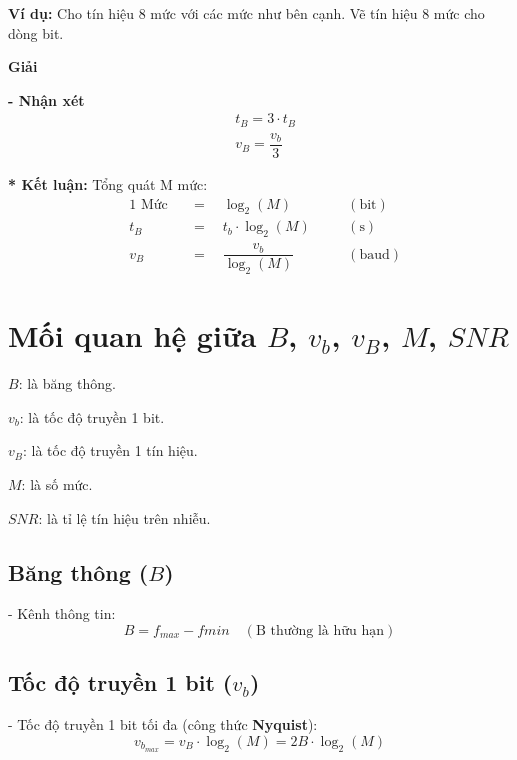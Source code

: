 \noindent\textbf{Ví dụ:} Cho tín hiệu 8 mức với các mức như bên cạnh. Vẽ tín hiệu 8 mức cho dòng bit.

\begin{center}
    
\end{center}

\begin{center}
    \textbf{Giải}
\end{center}

\begin{center}
    
\end{center}

\textbf{- Nhận xét}
\[
    \boxed{
        \begin{aligned}
            &t_B = 3 \cdot t_B\\[6pt]
            &v_B = \dfrac{v_b}{3}
        \end{aligned}
    }
\]

\noindent\textbf{* Kết luận: } Tổng quát M mức:
\[
    \boxed{
        \begin{aligned}
            &1 \text{ Mức} &&= \quad \log_2 (M) \quad &&(\text{bit})\\[6pt]
            &t_B &&= \quad t_b \cdot \log_2 (M) \quad &&(\text{s})\\[6pt]
            &v_B &&= \quad \dfrac{v_b}{\log_2 (M)} \quad &&(\text{baud})
        \end{aligned}   
    }
\]

\section{Mối quan hệ giữa $B$, $v_b$, $v_B$, $M$, $SNR$}
$B$: là băng thông.

$v_b$: là tốc độ truyền 1 bit.

$v_B$: là tốc độ truyền 1 tín hiệu.

$M$: là số mức.

$SNR$: là tỉ lệ tín hiệu trên nhiễu.

\subsection{Băng thông ($B$)}
- Kênh thông tin:
\[
    \boxed{B = f_{max} - f{min}} \quad (\text{B thường là hữu hạn})
\]

\subsection{Tốc độ truyền 1 bit ($v_b$)}
- Tốc độ truyền 1 bit tối đa (công thức \textbf{Nyquist}):
\[
    \boxed{
        v_{b_{max}} = v_B \cdot \log_2 (M) = 2B \cdot \log_2 (M)
    }
\]

